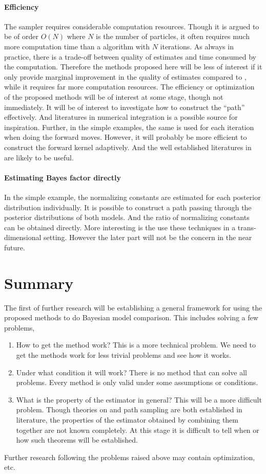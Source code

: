 \paragraph{Efficiency} The \smc sampler requires considerable computation
resources. Though it is argued to be of order $O(N)$ where $N$ is the number
of particles, it often requires much more computation time than a \mcmc
algorithm with $N$ iterations. As always in practice, there is a trade-off
between quality of estimates and time consumed by the computation. Therefore
the methods proposed here will be less of interest if it only provide marginal
improvement in the quality of estimates compared to \mcmc, while it requires
far more computation resources. The efficiency or optimization of the proposed
methods will be of interest at some stage, though not immediately. It will be
of interest to investigate how to construct the ``path'' effectively. And
literatures in numerical integration is a possible source for inspiration.
Further, in the simple examples, the same \mha is used for each iteration when
doing the forward moves. However, it will probably be more efficient to
construct the forward kernel adaptively. And the well established literatures
in \mcmc are likely to be useful.

\paragraph{Estimating Bayes factor directly} In the simple example, the
normalizing constants are estimated for each posterior distribution
individually. It is possible to construct a path passing through the posterior
distributions of both models. And the ratio of normalizing constants can be
obtained directly. More interesting is the use these techniques in a
trans-dimensional setting. However the later part will not be the concern in
the near future.

\section{Summary}
\label{sec:5-Summary}

The first of further research will be establishing a general
framework for using the proposed methods to do Bayesian model comparison. This
includes solving a few problems,
\begin{enumerate}
  \item How to get the method work? This is a more technical problem. We need
    to get the methods work for less trivial problems and see how it works.
  \item Under what condition it will work? There is no method that can solve
    all problems. Every method is only valid under some assumptions or
    conditions.
  \item What is the property of the estimator in general? This will be a more
    difficult problem. Though theories on \smc and path sampling are both
    established in literature, the properties of the estimator obtained by
    combining them together are not known completely. At this stage it is
    difficult to tell when or how such theorems will be established.
\end{enumerate}
Further research following the problems raised above may contain optimization,
etc.
